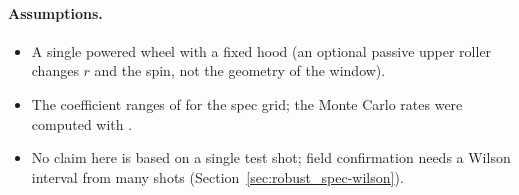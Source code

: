 \paragraph{Assumptions.}
\begin{itemize}
  \item A single powered wheel with a fixed hood (an optional passive upper roller changes $r$ and
    the spin, not the geometry of the window).
  \item The coefficient ranges of  for the spec grid; the Monte Carlo
    rates were computed with .
  \item No claim here is based on a single test shot; field confirmation needs a Wilson interval
    from many shots (Section~\ref{sec:robust_spec-wilson}).
\end{itemize}
